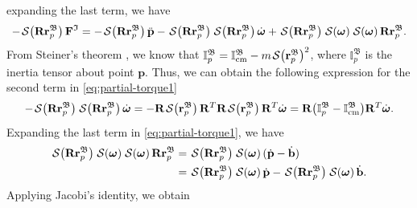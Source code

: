 expanding the last term, we have
\begin{align}
    - \SL[\mathbf{R}\mathbf{r}^\mathfrak{B}_p]\mathbf{F}^\mathfrak{I} = 
    - \SL[\mathbf{R}\mathbf{r}^\mathfrak{B}_p]\ddot{\mathbf{p}} - \SL[\mathbf{R}\mathbf{r}^\mathfrak{B}_p]\SL[\mathbf{R}\mathbf{r}_p^\mathfrak{B}]\dot{\boldsymbol{\omega}} + \SL[\mathbf{R}\mathbf{r}^\mathfrak{B}_p]\SL[\boldsymbol{\omega}]\SL[\boldsymbol{\omega}]\mathbf{R}\mathbf{r}_p^\mathfrak{B}. \label{eq:partial-torque1}
\end{align}
From Steiner's theorem \citep{lemos2018analytical}, we know that $\mathbb{I}^\mathfrak{B}_p = \mathbb{I}^\mathfrak{B}_\text{cm} - m\SL[\mathbf{r}_p^\mathfrak{B}]^2$, where $\mathbb{I}^\mathfrak{B}_p$ is the inertia tensor about point $\mathbf{p}$. Thus, we can obtain the following expression for the second term in \eqref{eq:partial-torque1}
\begin{align}
    - \SL[\mathbf{R}\mathbf{r}^\mathfrak{B}_p]\SL[\mathbf{R}\mathbf{r}_p^\mathfrak{B}]\dot{\boldsymbol{\omega}} = - \mathbf{R}\SL[\mathbf{r}^\mathfrak{B}_p]\mathbf{R}^T\mathbf{R}\SL[\mathbf{r}_p^\mathfrak{B}]\mathbf{R}^T\dot{\boldsymbol{\omega}} = \mathbf{R}\bigl(\mathbb{I}^\mathfrak{B}_p - \mathbb{I}^\mathfrak{B}_\text{cm}\bigr)\mathbf{R}^T\dot{\boldsymbol{\omega}}.
    \label{eq:partial-torque2}
\end{align}
Expanding the last term in \eqref{eq:partial-torque1}, we have
\begin{align}
    \begin{split}
        \SL[\mathbf{R}\mathbf{r}^\mathfrak{B}_p]\SL[\boldsymbol{\omega}]\SL[\boldsymbol{\omega}]\mathbf{R}\mathbf{r}_p^\mathfrak{B} &= \SL[\mathbf{R}\mathbf{r}^\mathfrak{B}_p]\SL[\boldsymbol{\omega}](\dot{\mathbf{p}} - \dot{\mathbf{b}})\\
        &= \SL[\mathbf{R}\mathbf{r}^\mathfrak{B}_p]\SL[\boldsymbol{\omega}]\dot{\mathbf{p}} - \SL[\mathbf{R}\mathbf{r}^\mathfrak{B}_p]\SL[\boldsymbol{\omega}]\dot{\mathbf{b}}.
    \end{split}
\end{align}
Applying Jacobi's identity, we obtain
